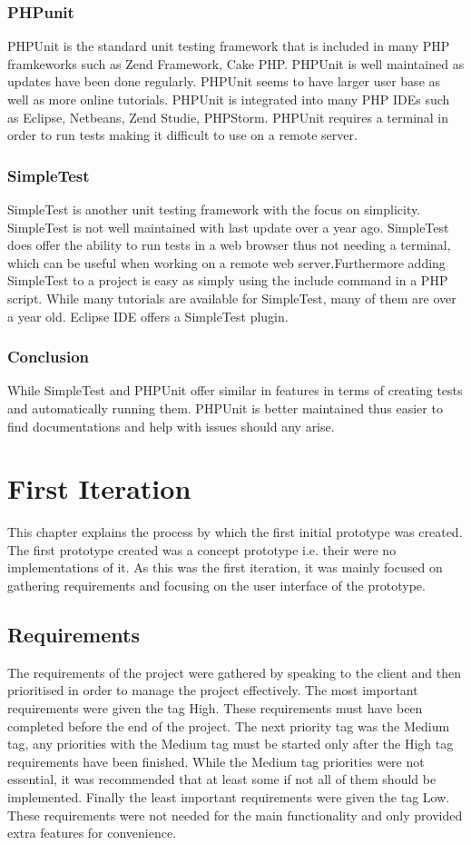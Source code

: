 \documentclass[a4paper,oneside,11pt]{report}
\begin{document}
\subsection{PHPunit}
PHPUnit is the standard unit testing framework that is included in many PHP framkeworks such as Zend Framework, Cake PHP. PHPUnit is well maintained as updates have been done regularly. PHPUnit seems to have larger user base as well as more online tutorials. PHPUnit is integrated into many PHP IDEs  such as Eclipse, Netbeans, Zend Studie, PHPStorm. PHPUnit requires a terminal in order to run tests making it difficult to use on a remote server.
\subsection{SimpleTest}
SimpleTest is another unit testing framework with the focus on simplicity. SimpleTest is not well maintained with last update over a year ago. SimpleTest does offer the ability to run tests in a web browser thus not needing a terminal, which can be useful when working on a remote web server.Furthermore adding SimpleTest to a project is easy as simply using the include command in a PHP script. While many tutorials are available for SimpleTest, many of them are over a year old. Eclipse IDE offers a SimpleTest plugin.

\subsection{Conclusion}
While SimpleTest and PHPUnit offer similar in features in terms of creating tests and automatically running them. PHPUnit is better maintained thus easier to find documentations and help with issues should any arise.

\chapter{First Iteration}
This chapter explains the process by which the first initial prototype was created. The first prototype created was a concept prototype i.e. their were no implementations of it. As this was the first iteration, it was mainly focused on gathering requirements and focusing on the user interface of the prototype.

\section{Requirements}
The requirements of the project were gathered by speaking to the client and then prioritised in order to manage the project effectively. The most important requirements were given the tag High. These requirements must have been completed before the end of the project. The next priority tag was the Medium tag, any priorities with the Medium tag must be started only after the High tag requirements have been finished. While the Medium tag priorities were not essential, it was recommended that at least some if not all of them should be implemented. Finally the least important requirements were given the tag Low. These requirements were not needed for the main functionality and only provided extra features for convenience.
\end{document}
